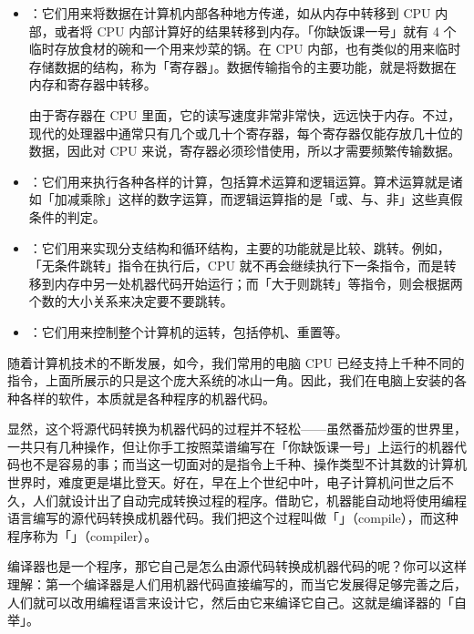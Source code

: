 \begin{itemize}
  \item {}：它们用来将数据在计算机内部各种地方传递，如从内存中转移到 CPU 内部，或者将 CPU 内部计算好的结果转移到内存。「你缺饭课一号」就有 4 个临时存放食材的碗和一个用来炒菜的锅。在 CPU 内部，也有类似的用来临时存储数据的结构，称为「寄存器」。数据传输指令的主要功能，就是将数据在内存和寄存器中转移。
    \begin{note}
      由于寄存器在 CPU 里面，它的读写速度非常非常快，远远快于内存。不过，现代的处理器中通常只有几个或几十个寄存器，每个寄存器仅能存放几十位的数据，因此对 CPU 来说，寄存器必须珍惜使用，所以才需要频繁传输数据。
    \end{note}
  \item {}：它们用来执行各种各样的计算，包括算术运算和逻辑运算。算术运算就是诸如「加减乘除」这样的数字运算，而逻辑运算指的是「或、与、非」这些真假条件的判定。
  \item {}：它们用来实现分支结构和循环结构，主要的功能就是比较、跳转。例如，「无条件跳转」指令在执行后，CPU 就不再会继续执行下一条指令，而是转移到内存中另一处机器代码开始运行；而「大于则跳转」等指令，则会根据两个数的大小关系来决定要不要跳转。
  \item {}：它们用来控制整个计算机的运转，包括停机、重置等。
\end{itemize}

随着计算机技术的不断发展，如今，我们常用的电脑 CPU 已经支持上千种不同的指令，上面所展示的只是这个庞大系统的冰山一角。因此，我们在电脑上安装的各种各样的软件，本质就是各种程序的机器代码。

显然，这个将源代码转换为机器代码的过程并不轻松——虽然番茄炒蛋的世界里，一共只有几种操作，但让你手工按照菜谱编写在「你缺饭课一号」上运行的机器代码也不是容易的事；而当这一切面对的是指令上千种、操作类型不计其数的计算机世界时，难度更是堪比登天。好在，早在上个世纪中叶，电子计算机问世之后不久，人们就设计出了自动完成转换过程的程序。借助它，机器能自动地将使用编程语言编写的源代码转换成机器代码。我们把这个过程叫做「」（compile），而这种程序称为「」（compiler）。

\begin{note}
  编译器也是一个程序，那它自己是怎么由源代码转换成机器代码的呢？你可以这样理解：第一个编译器是人们用机器代码直接编写的，而当它发展得足够完善之后，人们就可以改用编程语言来设计它，然后由它来编译它自己。这就是编译器的「自举」。
\end{note}

